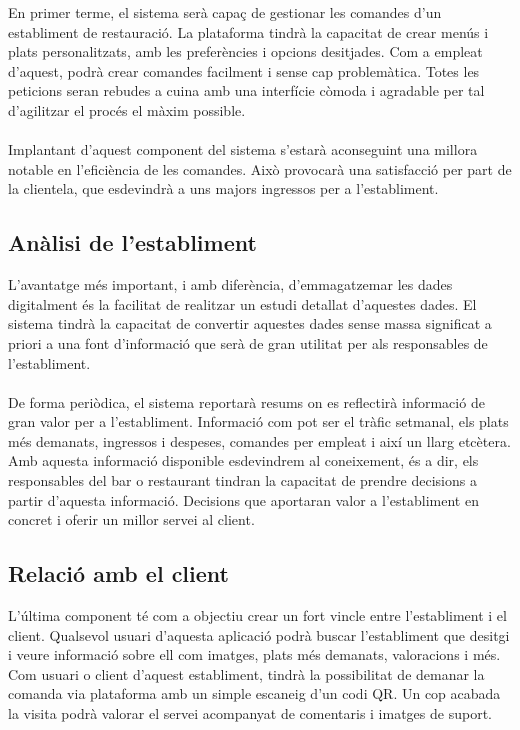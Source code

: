 En primer terme, el sistema serà capaç de gestionar les comandes d’un establiment de restauració. La plataforma tindrà la capacitat de crear menús i plats personalitzats, amb les preferències i opcions desitjades. Com a empleat d’aquest, podrà crear comandes facilment i sense cap problemàtica. Totes les peticions seran rebudes a cuina amb una interfície còmoda i agradable per tal d’agilitzar el procés el màxim possible.
\\\\
Implantant d’aquest component del sistema s’estarà aconseguint una millora notable en l’eficiència de les comandes. Això provocarà una satisfacció per part de la clientela, que esdevindrà a uns majors ingressos per a l’establiment.

\subsection{Anàlisi de l'establiment}

L’avantatge més important, i amb diferència, d’emmagatzemar les dades digitalment és la facilitat de realitzar un estudi detallat d’aquestes dades. El sistema tindrà la capacitat de convertir aquestes dades sense massa significat a priori a una font d’informació que serà de gran utilitat per als responsables de l’establiment.
\\\\
De forma periòdica, el sistema reportarà resums on es reflectirà informació de gran valor per a l’establiment. Informació com pot ser el tràfic setmanal, els plats més demanats, ingressos i despeses, comandes per empleat i així un llarg etcètera. Amb aquesta informació disponible esdevindrem al coneixement, és a dir, els responsables del bar o restaurant tindran la capacitat de prendre decisions a partir d’aquesta informació. Decisions que aportaran valor a l’establiment en concret i oferir un millor servei al client.

\subsection{Relació amb el client}

L’última component té com a objectiu crear un fort vincle entre l’establiment i el client. Qualsevol usuari d’aquesta aplicació podrà buscar l’establiment que desitgi i veure informació sobre ell com imatges, plats més demanats, valoracions i més. Com usuari o client d’aquest establiment, tindrà la possibilitat de demanar la comanda via plataforma amb un simple escaneig d’un codi QR. Un cop acabada la visita podrà valorar el servei acompanyat de comentaris i imatges de suport.

